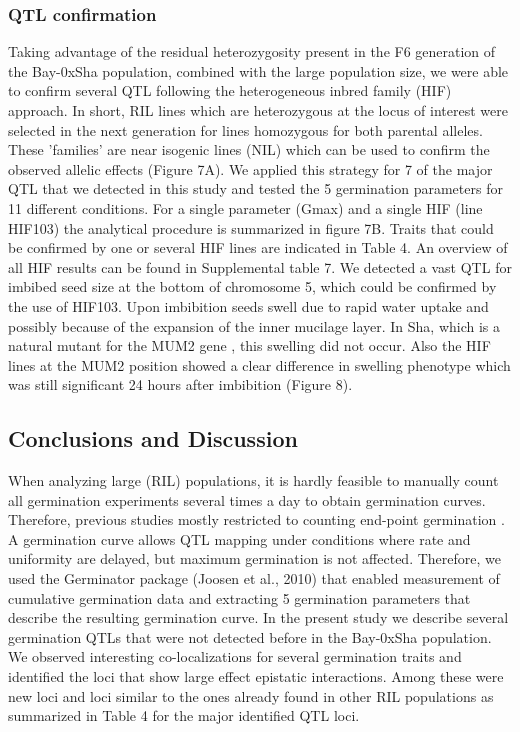 \subsubsection{QTL confirmation}
Taking advantage of the residual heterozygosity present in the F6 generation of the Bay-0xSha population, 
combined with the large population size, we were able to confirm several QTL following the heterogeneous 
inbred family (HIF) approach. In short, RIL lines which are heterozygous at the locus of interest were 
selected in the next generation for lines homozygous for both parental alleles. These 'families' are 
near isogenic lines (NIL) which can be used to confirm the observed allelic effects (Figure 7A). We 
applied this strategy for 7 of the major QTL that we detected in  this study and tested the 5 germination 
parameters for 11 different conditions. For a single parameter (Gmax) and a single HIF (line HIF103) the 
analytical procedure is summarized in figure 7B. Traits that could be confirmed by one or several HIF 
lines are indicated in Table 4. An overview of all HIF results can be found in Supplemental table 7. We 
detected a vast QTL for imbibed seed size at the bottom of chromosome 5, which could be confirmed by the 
use of HIF103. Upon imbibition seeds swell due to rapid water uptake and possibly because of the 
expansion of the inner mucilage layer. In Sha, which is a natural mutant for the MUM2 gene 
\cite{Macquet:2007}, this swelling did not occur. Also the HIF lines at the MUM2 position showed a 
clear difference in swelling phenotype which was still significant 24 hours after imbibition (Figure 8).

\subsection{Conclusions and Discussion}
When analyzing large (RIL) populations, it is hardly feasible to manually count all germination 
experiments several times a day to obtain germination curves. Therefore, previous studies mostly 
restricted to counting end-point germination \cite{Quesada:2002, Alonso-Blanco:2003, Clerkx:2004, 
Laserna:2008, Meng:2008, Bentsink:2010, Galpaz:2010, Vallejo:2010}. A germination curve allows QTL 
mapping under conditions where rate and uniformity are delayed, but maximum germination is not 
affected. Therefore, we used the Germinator package (Joosen et al., 2010) that enabled measurement 
of cumulative germination data and extracting 5 germination parameters that describe the resulting 
germination curve. In the present study we describe several germination QTLs that were not detected 
before in the Bay-0xSha population. We observed interesting co-localizations for several germination 
traits and identified the loci that show large effect epistatic interactions. Among these were new 
loci and loci similar to the ones already found in other RIL populations as summarized in Table 4 for 
the major identified QTL loci.

